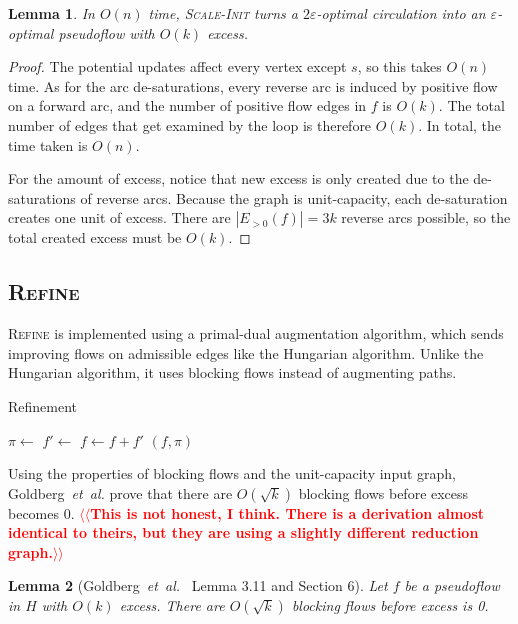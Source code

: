 \documentclass[11pt]{article}
\makeatletter
\def\etal{\textsl{et~al.}}
\def\eps{\varepsilon}
\theoremstyle{plain}
\newtheorem{lemma}{Lemma}[section]
\numberwithin{figure}{section}
\def\n@te#1{\textsf{\boldmath \textbf{$\langle\!\langle$#1$\rangle\!\rangle$}}\leavevmode}
\def\note#1{\textcolor{red}{\n@te{#1}}}
\makeatother
\begin{document}
\begin{lemma}
\label{lemma:scale_init}
In $O(n)$ time, \textsc{Scale-Init} turns a $2\eps$-optimal circulation into an
$\eps$-optimal pseudoflow with $O(k)$ excess.
\end{lemma}

\begin{proof}
The potential updates affect every vertex except $s$, so this takes $O(n)$
time.
As for the arc de-saturations, every reverse arc is induced by positive flow on
a forward arc, and the number of positive flow edges in $f$ is $O(k)$.
The total number of edges that get examined by the loop is therefore $O(k)$.
In total, the time taken is $O(n)$.

For the amount of excess, notice that new excess is only created due to the
de-saturations of reverse arcs.
Because the graph is unit-capacity, each de-saturation creates one unit of
excess.
There are $|E_{>0}(f)| = 3k$ reverse arcs possible, so the total created excess
must be $O(k)$.
\end{proof}

\subsection{\textsc{Refine}}

\textsc{Refine} is implemented using a primal-dual augmentation algorithm,
which sends improving flows on admissible edges like the Hungarian algorithm.
Unlike the Hungarian algorithm, it uses blocking flows instead of augmenting
paths.

\begin{algorithm}
\caption{Refinement}
\begin{algorithmic}[1]
		\State $\pi \gets$ 
		\State $f' \gets$ 
		\State $f \gets f + f'$
	\EndWhile
	\State\Return $(f, \pi)$
\EndFunction
\end{algorithmic}
\end{algorithm}

Using the properties of blocking flows and the unit-capacity input graph,
Goldberg~{\etal} prove that there are $O(\sqrt{k})$ blocking flows before
excess becomes 0.
\note{This is not honest, I think. There is a derivation almost identical to theirs, but they are using a slightly different reduction graph.}

\begin{lemma}[Goldberg~{\etal}~\cite{GHKT17} Lemma 3.11 and Section 6]
Let $f$ be a pseudoflow in $H$ with $O(k)$ excess.
There are $O(\sqrt{k})$ blocking flows before excess is 0.
\end{lemma}
\end{document}
